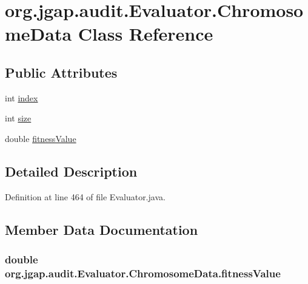 \hypertarget{classorg_1_1jgap_1_1audit_1_1_evaluator_1_1_chromosome_data}{\section{org.\-jgap.\-audit.\-Evaluator.\-Chromosome\-Data Class Reference}
\label{classorg_1_1jgap_1_1audit_1_1_evaluator_1_1_chromosome_data}
}
\subsection*{Public Attributes}
\begin{DoxyCompactItemize}
\item 
int \hyperlink{classorg_1_1jgap_1_1audit_1_1_evaluator_1_1_chromosome_data_a4ea7171a22feb8dafcaf26efe86d7f1f}{index}
\item 
int \hyperlink{classorg_1_1jgap_1_1audit_1_1_evaluator_1_1_chromosome_data_a446ea7472f2a4f26eeee6dbb42b89dd2}{size}
\item 
double \hyperlink{classorg_1_1jgap_1_1audit_1_1_evaluator_1_1_chromosome_data_a7026f257606f9dc7aa7b7f397ae8e4cb}{fitness\-Value}
\end{DoxyCompactItemize}


\subsection{Detailed Description}


Definition at line 464 of file Evaluator.\-java.



\subsection{Member Data Documentation}
\hypertarget{classorg_1_1jgap_1_1audit_1_1_evaluator_1_1_chromosome_data_a7026f257606f9dc7aa7b7f397ae8e4cb}{
\subsubsection[{fitness\-Value}]{\setlength{\rightskip}{0pt plus 5cm}double org.\-jgap.\-audit.\-Evaluator.\-Chromosome\-Data.\-fitness\-Value}}\label{classorg_1_1jgap_1_1audit_1_1_evaluator_1_1_chromosome_data_a7026f257606f9dc7aa7b7f397ae8e4cb}


